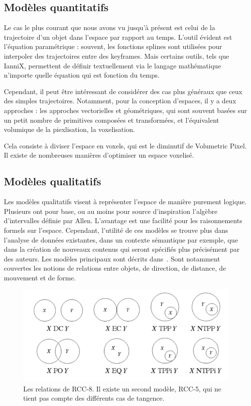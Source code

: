 \documentclass[french,12pt]{article}
\begin{document}
\subsection{Modèles quantitatifs}
Le cas le plus courant que nous avons vu jusqu'à présent est celui de la trajectoire d'un objet dans l'espace par rapport au temps.
L'outil évident est l'équation paramétrique : souvent, les fonctions splines sont utilisées pour interpoler 
des trajectoires entre des keyframes. Mais certains outils, tels que IanniX, permettent de définir textuellement
via le langage mathématique n'importe quelle équation qui est fonction du temps.

Cependant, il peut être intéressant de considérer des cas plus généraux que ceux des simples trajectoires. 
Notamment, pour la conception d'espaces, il y a deux approches : les approches vectorielles et géométriques, 
qui sont souvent basées sur un petit nombre de primitives composées et transformées, et l'équivalent 
volumique de la piexlisation, la voxelisation.

Cela consiste à diviser l'espace en voxels\cite{kaufman_volume_1993}, qui est le diminutif de Volumetric Pixel.
Il existe de nombreuses manières d'optimiser un espace voxelisé.




\subsection{Modèles qualitatifs}
Les modèles qualitatifs visent à représenter l'espace de manière purement logique. Plusieurs ont pour base, ou au moins pour source d'inspiration l'algèbre d'intervalles définie par Allen\cite{allen_towards_1984}. L'avantage est une facilité pour les raisonnements formels sur l'espace. Cependant, l'utilité de ces modèles se trouve plus dans l'analyse de données existantes, dans un contexte sémantique par exemple, que dans la création de nouveaux contenus qui seront spécifiés plus précisément par des auteurs. Les modèles principaux sont décrits dans~\cite{chen_survey_2015}. Sont notamment couvertes les notions de relations entre objets, de direction, de distance, de mouvement et de forme. 

\begin{figure}[h]
    \centering
    \includegraphics[scale=1]{images/rcc8.jpg}
    \caption{Les relations de RCC-8. Il existe un second modèle, RCC-5, qui ne tient pas compte des différents cas de tangence.}
    \label{fig.shapetape}
\end{figure}
\end{document}
